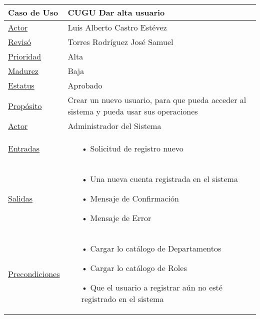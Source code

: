 				\begin{longtable}{p{4cm}|p{11cm}}
				\hline
					{Caso de Uso}&{CUGU Dar alta usuario}\\
				\hline
					{\hyperlink {Autor}{Actor}}&{Luis Alberto Castro Est\'evez }\\
				\hline
					{\hyperlink {Reviso}{Revis\'o}}&{Torres Rodr\'iguez Jos\'e Samuel}\\
				\hline
					{\hyperlink {Prioridad}{Prioridad}}&{Alta}\\
				\hline
					{\hyperlink {Madurez}{Madurez}}&{Baja}\\
				\hline
					{\hyperlink {Estatus}{Estatus}}&{Aprobado }\\
				\hline
					{\hyperlink {Proposito}{Prop\'osito}}&{Crear un nuevo usuario, para que pueda acceder al sistema y pueda usar sus operaciones}\\
				\hline
					{\hyperlink {Actor}{Actor}}&{Administrador del Sistema}\\
				\hline
					{\hyperlink {Entradas}{Entradas}}&{ 
					\begin{itemize}
						\item[•] Solicitud de registro nuevo
					\end{itemize}	 }\\

				\hline
					{\hyperlink {Salidas}{Salidas}}&{
					\begin{itemize}
						\item[•] Una nueva cuenta registrada en el sistema
						\item[•] Mensaje de Confirmaci\'on
						\item[•] Mensaje de Error
					\end{itemize}		
					}\\

				\hline
					{\hyperlink {Precondiciones}{Precondiciones}}&{
					\begin{itemize}
						\item[•] Cargar lo cat\'alogo de Departamentos
						\item[•] Cargar lo cat\'alogo de Roles
						\item[•] Que el usuario a registrar a\'un no est\'e registrado en el sistema
						\end{itemize}	
					}\\


\end{longtable}
